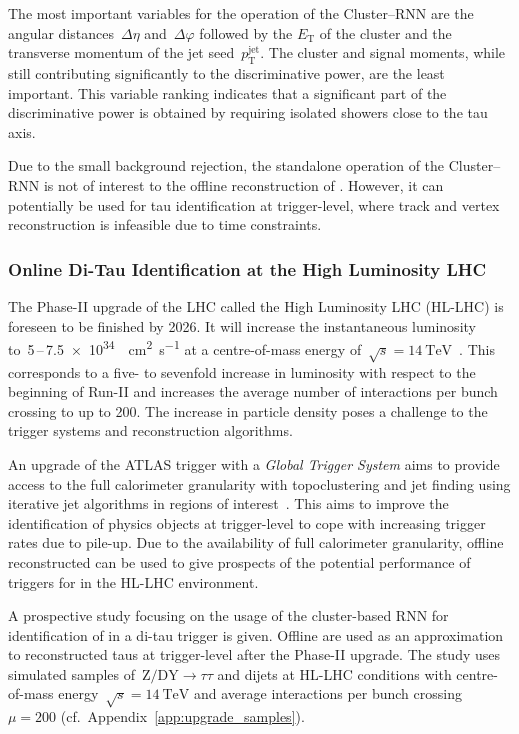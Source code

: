 The most important variables for the operation of the Cluster--RNN are the
angular distances~$\Delta \eta$ and~$\Delta \varphi$ followed by the
$E_\text{T}$ of the cluster and the transverse momentum of the jet
seed~$p_\text{T}^\text{jet}$. The cluster and signal moments, while still
contributing significantly to the discriminative power, are the least important.
This variable ranking indicates that a significant part of the discriminative
power is obtained by requiring isolated showers close to the tau axis.

Due to the small background rejection, the standalone operation of the
Cluster--RNN is not of interest to the offline reconstruction of \tauhadvis.
However, it can potentially be used for tau identification at trigger-level,
where track and vertex reconstruction is infeasible due to time constraints.

\subsubsection{Online Di-Tau Identification at the High Luminosity LHC}
\label{sec:hlt_rate_reduction}

The Phase-II upgrade of the LHC called the High Luminosity LHC (HL-LHC) is
foreseen to be finished by 2026. It will increase the instantaneous luminosity
to~\num{5}\,--\,\SI{7.5e34}{\per\square\centi\metre\per\second} at a
centre-of-mass energy
of~$\sqrt{s} = \SI{14}{\TeV}$~\cite{hl_lhc_prelim_design_report}. This
corresponds to a five- to sevenfold increase in luminosity with respect to the
beginning of Run-II and increases the average number of interactions per bunch
crossing to up to \num{200}. The increase in particle density poses a challenge
to the trigger systems and reconstruction algorithms.

An upgrade of the ATLAS trigger with a \emph{Global Trigger System} aims to
provide access to the full calorimeter granularity with topoclustering and jet
finding using iterative jet algorithms in regions of
interest~\cite{phase_2_scoping}. This aims to improve the identification of
physics objects at trigger-level to cope with increasing trigger rates due to
pile-up. Due to the availability of full calorimeter granularity, offline
reconstructed \tauhadvis can be used to give prospects of the potential
performance of triggers for \tauhadvis in the HL-LHC environment.

A prospective study focusing on the usage of the cluster-based RNN for
identification of \tauhadvis in a di-tau trigger is given. Offline \tauhadvis
are used as an approximation to reconstructed taus at trigger-level after the
Phase-II upgrade. The study uses simulated samples
of~$\text{Z} / \text{DY} \to \tau \tau$ and dijets at HL-LHC conditions with
centre-of-mass energy~$\sqrt{s}=\SI{14}{\TeV}$ and average interactions per
bunch crossing~$\mu = 200$ (cf.\ Appendix~\ref{app:upgrade_samples}).

